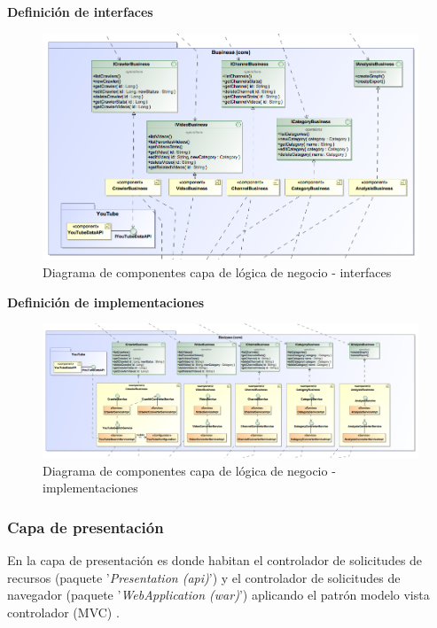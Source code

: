 \documentclass[11pt,a4paper]{article}
\begin{document}
\noindent\textbf{Definición de interfaces}
\begin{figure}[H]
\centering
\includegraphics[scale=0.3]{diseno/negocio/ComponentDiagram2.png}
\caption{Diagrama de componentes capa de lógica de negocio - interfaces}
\end{figure}
\newpage 

\noindent\textbf{Definición de implementaciones}
\begin{figure}[H]
\centering
\includegraphics[scale=0.25]{diseno/negocio/ComponentDiagram3.png}
\caption{Diagrama de componentes capa de lógica de negocio - implementaciones}
\end{figure}

\medskip 

\subsubsection{Capa de presentación}
En la capa de presentación es donde habitan el controlador de solicitudes de recursos (paquete '\textit{Presentation (api)}') y el controlador de solicitudes de navegador (paquete '\textit{WebApplication (war)}') aplicando el patrón modelo vista controlador (MVC) \cite{19}.
\\
\end{document}
